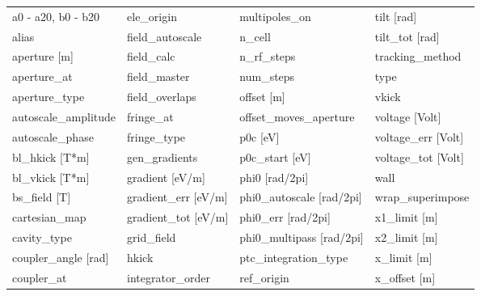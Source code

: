  \begin{tabular}{llll} \toprule
a0 - a20, b0 - b20               & ele_origin                       & multipoles_on                    & tilt [rad]                       \\
alias                            & field_autoscale                  & n_cell                           & tilt_tot [rad]                   \\
aperture [m]                     & field_calc                       & n_rf_steps                       & tracking_method                  \\
aperture_at                      & field_master                     & num_steps                        & type                             \\
aperture_type                    & field_overlaps                   & offset [m]                       & vkick                            \\
autoscale_amplitude              & fringe_at                        & offset_moves_aperture            & voltage [Volt]                   \\
autoscale_phase                  & fringe_type                      & p0c [eV]                         & voltage_err [Volt]               \\
bl_hkick [T*m]                   & gen_gradients                    & p0c_start [eV]                   & voltage_tot [Volt]               \\
bl_vkick [T*m]                   & gradient [eV/m]                  & phi0 [rad/2pi]                   & wall                             \\
bs_field [T]                     & gradient_err [eV/m]              & phi0_autoscale [rad/2pi]         & wrap_superimpose                 \\
cartesian_map                    & gradient_tot [eV/m]              & phi0_err [rad/2pi]               & x1_limit [m]                     \\
cavity_type                      & grid_field                       & phi0_multipass [rad/2pi]         & x2_limit [m]                     \\
coupler_angle [rad]              & hkick                            & ptc_integration_type             & x_limit [m]                      \\
coupler_at                       & integrator_order                 & ref_origin                       & x_offset [m]                     \\

\end{tabular}
